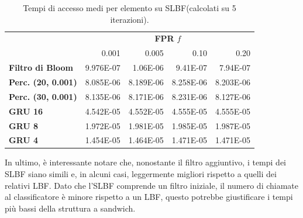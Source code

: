 \documentclass[../../main.tex]{subfiles}
\begin{document}
    \begin{table}[H]
        \centering
        \begin{tabular}{lrrrr}
            \toprule
            & \multicolumn{4}{c}{\textbf{FPR} $f$}\\
            & 0.001 & 0.005 & 0.10 & 0.20\\        
            \midrule
            \textbf{Filtro di Bloom} & 9.976E-07 & 1.06E-06 & 9.41E-07 & 7.94E-07\\
            \midrule
            \textbf{Perc. (20, 0.001)} & 8.085E-06 & 8.189E-06 &  8.258E-06 & 8.203E-06\\
            \textbf{Perc. (30, 0.001)} & 8.135E-06 & 8.171E-06 &  8.231E-06 & 8.127E-06\\
            \textbf{GRU 16} & 4.542E-05 & 4.552E-05 &  4.555E-05 & 4.555E-05\\
            \textbf{GRU 8} &  1.972E-05 & 1.981E-05 &  1.985E-05 & 1.987E-05\\
            \textbf{GRU 4} & 1.454E-05 & 1.464E-05 & 1.471E-05 & 1.471E-05\\
            \bottomrule
        \end{tabular}
        \caption{Tempi di accesso medi per elemento su SLBF(calcolati su 5 iterazioni).}
        \label{tab:tempiMediSLBF}
    \end{table}

    In ultimo, è interessante notare che, nonostante il filtro aggiuntivo, i tempi dei SLBF siano simili e, in alcuni casi, leggermente migliori rispetto a quelli dei relativi LBF. Dato che l'SLBF comprende un filtro iniziale, il numero di chiamate al classificatore è minore rispetto a un LBF, questo potrebbe giustificare i tempi più bassi della struttura a sandwich.
\end{document}
